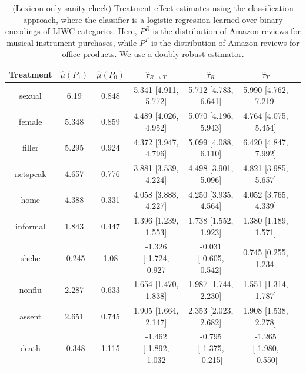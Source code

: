 \documentclass{article}
\begin{document}
\begin{table}[!ht]
\centering
\begin{tabular}{c|cccccc}
\toprule
    Treatment   &   $\hat{\mu}(P_1)$ &   $\hat{\mu}(P_0)$ & $\hat{\tau}_{R \rightarrow T}$   & $\hat{\tau}_R$          & $\hat{\tau}_T$          \\
\midrule
    sexual      &              6.19  &              0.848 & 5.341 [4.911, 5.772]             & 5.712 [4.783, 6.641]    & 5.990 [4.762, 7.219]    \\
    female      &              5.348 &              0.859 & 4.489 [4.026, 4.952]             & 5.070 [4.196, 5.943]    & 4.764 [4.075, 5.454]    \\
    filler      &              5.295 &              0.924 & 4.372 [3.947, 4.796]             & 5.099 [4.088, 6.110]    & 6.420 [4.847, 7.992]    \\
    netspeak    &              4.657 &              0.776 & 3.881 [3.539, 4.224]             & 4.498 [3.901, 5.096]    & 4.821 [3.985, 5.657]    \\
    home        &              4.388 &              0.331 & 4.058 [3.888, 4.227]             & 4.250 [3.935, 4.564]    & 4.052 [3.765, 4.339]    \\
    informal    &              1.843 &              0.447 & 1.396 [1.239, 1.553]             & 1.738 [1.552, 1.923]    & 1.380 [1.189, 1.571]    \\
    shehe       &             -0.245 &              1.08  & -1.326 [-1.724, -0.927]          & -0.031 [-0.605, 0.542]  & 0.745 [0.255, 1.234]    \\
    nonflu      &              2.287 &              0.633 & 1.654 [1.470, 1.838]             & 1.987 [1.744, 2.230]    & 1.551 [1.314, 1.787]    \\
    assent      &              2.651 &              0.745 & 1.905 [1.664, 2.147]             & 2.353 [2.023, 2.682]    & 1.908 [1.538, 2.278]    \\
    death       &             -0.348 &              1.115 & -1.462 [-1.892, -1.032]          & -0.795 [-1.375, -0.215] & -1.265 [-1.980, -0.550] \\
\bottomrule
\end{tabular}
\caption{(Lexicon-only sanity check) Treatment effect estimates using the classification approach, where the classifier is a logistic regression learned over binary encodings of LIWC categories. Here, $P^R$ is the distribution of Amazon reviews for musical instrument purchases, while $P^T$ is the distribution of Amazon reviews for office products. We use a doubly robust estimator.}
\label{tab:results_clf_mpnet_amazon_synthetic_lexonly_dr}
\end{table}
\end{document}

